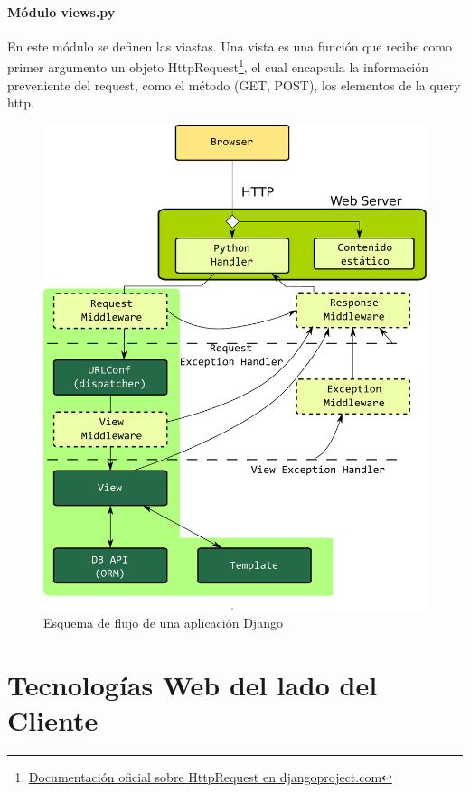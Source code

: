 \documentclass[a4paper]{report}
\begin{document}
\subsubsection*{Módulo views.py}
En este módulo se definen las viastas. Una vista es una función que recibe como primer
argumento un objeto HttpRequest\footnote{
\href{http://docs.djangoproject.com/en/dev/ref/request-response/\#httprequest-objects}
{Documentación oficial sobre HttpRequest en djangoproject.com}}, el cual encapsula la información preveniente del request, 
como el método (GET, POST), los elementos de la query http.
\begin{figure}[htp]
\centering
\includegraphics[scale=0.40]{img/django_strucure.pdf}
\caption{Esquema de flujo de una aplicación Django}\label{fig:erptsqfit}
\end{figure}




\chapter{Tecnologías Web del lado del Cliente}
\end{document}
